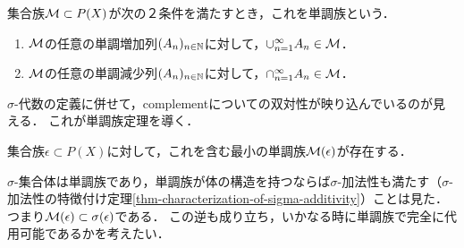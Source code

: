 \documentclass[uplatex, dvipdfmx]{jsreport}
\begin{document}
\begin{definition}
    集合族$\mathcal{M}\subset P(X)$が次の２条件を満たすとき，これを単調族という．
    \begin{enumerate}
        \item $\mathcal{M}$の任意の単調増加列$(A_n)_{n\in\mathbb{N}}$に対して，$\cup^\infty_{n=1}A_n\in\mathcal{M}$．
        \item $\mathcal{M}$の任意の単調減少列$(A_n)_{n\in\mathbb{N}}$に対して，$\cap^\infty_{n=1}A_n\in\mathcal{M}$．
    \end{enumerate}
\end{definition}
\begin{remarks}
    $\sigma$-代数の定義に併せて，complementについての双対性が映り込んでいるのが見える．
    これが単調族定理を導く．
\end{remarks}

\begin{proposition}
    集合族$\epsilon\subset P(X)$に対して，これを含む最小の単調族$\mathcal{M}(\epsilon)$が存在する．
\end{proposition}

\begin{observation}
    $\sigma$-集合体は単調族であり，単調族が体の構造を持つならば$\sigma$-加法性も満たす（$\sigma$-加法性の特徴付け定理\ref{thm-characterization-of-sigma-additivity}）ことは見た．
    つまり$\mathcal{M}(\epsilon)\subset\sigma(\epsilon)$である．
    この逆も成り立ち，いかなる時に単調族で完全に代用可能であるかを考えたい．
\end{observation}
\end{document}
